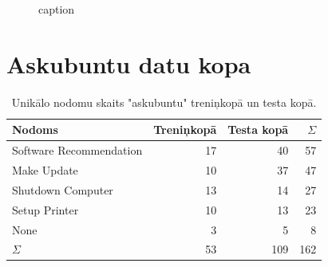 \begin{figure}[h] 
   \centering
   \caption{caption} 
   \label{fig:chatbot-xlm-all}
\end{figure}


\section{Askubuntu datu kopa}

\begin{table}[htbp]
  \centering
  \caption{Unikālo nodomu skaits "askubuntu" treniņkopā un testa kopā.}
    \begin{tabular}{lrrr} \toprule
    Nodoms & Treniņkopā & Testa kopā & $\Sigma$ \\\midrule
    Software Recommendation & 17    & 40 & 57 \\
    Make Update & 10    & 37 & 47 \\
    Shutdown Computer & 13    & 14 & 27 \\
    Setup Printer & 10    & 13 & 23\\
    None  & 3     & 5 & 8\\
   $\Sigma$ & 53    & 109 & 162 \\\bottomrule
    \end{tabular}%
  \label{tab:askubuntu-labels}%
\end{table}%



